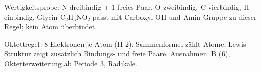 \begin{kontrolle}
Wertigkeitsprobe: $\mathrm{N}$ dreibindig + 1 freies Paar, $\mathrm{O}$
zweibindig, $\mathrm{C}$ vierbindig, H einbindig. Glycin
$\mathrm{C_2H_5NO_2}$ passt mit Carboxyl-$\mathrm{OH}$ und Amin-Gruppe zu dieser
Regel; kein Atom überbindet.
\end{kontrolle}

\begin{merksatz}
Oktettregel: 8 Elektronen je Atom (H 2). Summenformel zählt Atome;
Lewis-Struktur zeigt zusätzlich Bindungs- und freie Paare. Ausnahmen:
$\mathrm{B}$ (6), Oktetterweiterung ab Periode 3, Radikale.
\end{merksatz}
